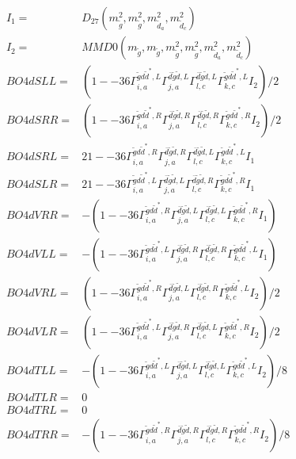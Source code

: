\documentclass[A4,landscape]{article}
\begin{document}
\begin{align} 
I_1 = & D_{27}(m^2_{\tilde{g}}, m^2_{\tilde{g}}, m^2_{\tilde{d}_{{a}}}, m^2_{\tilde{d}_{{c}}}) \\ 
I_2 = & MMD0(m_{\tilde{g}}, m_{\tilde{g}}, m^2_{\tilde{g}}, m^2_{\tilde{g}}, m^2_{\tilde{d}_{{a}}}, m^2_{\tilde{d}_{{c}}}) \\ 
  BO4dSLL= & (1
--
36 \Gamma^{\tilde{g} d \tilde{d}^*,L}_{i, a} \Gamma^{\bar{d}\tilde{g} \tilde{d} ,L}_{j, a} \Gamma^{\bar{d}\tilde{g} \tilde{d} ,L}_{l, c} \Gamma^{\tilde{g} d \tilde{d}^*,L}_{k, c} I_2)/2 \\ 
  BO4dSRR= & (1
--
36 \Gamma^{\tilde{g} d \tilde{d}^*,R}_{i, a} \Gamma^{\bar{d}\tilde{g} \tilde{d} ,R}_{j, a} \Gamma^{\bar{d}\tilde{g} \tilde{d} ,R}_{l, c} \Gamma^{\tilde{g} d \tilde{d}^*,R}_{k, c} I_2)/2 \\ 
  BO4dSRL= & 2 1
--
36 \Gamma^{\tilde{g} d \tilde{d}^*,R}_{i, a} \Gamma^{\bar{d}\tilde{g} \tilde{d} ,R}_{j, a} \Gamma^{\bar{d}\tilde{g} \tilde{d} ,L}_{l, c} \Gamma^{\tilde{g} d \tilde{d}^*,L}_{k, c} I_1 \\ 
  BO4dSLR= & 2 1
--
36 \Gamma^{\tilde{g} d \tilde{d}^*,L}_{i, a} \Gamma^{\bar{d}\tilde{g} \tilde{d} ,L}_{j, a} \Gamma^{\bar{d}\tilde{g} \tilde{d} ,R}_{l, c} \Gamma^{\tilde{g} d \tilde{d}^*,R}_{k, c} I_1 \\ 
  BO4dVRR= & -(1
--
36 \Gamma^{\tilde{g} d \tilde{d}^*,R}_{i, a} \Gamma^{\bar{d}\tilde{g} \tilde{d} ,L}_{j, a} \Gamma^{\bar{d}\tilde{g} \tilde{d} ,L}_{l, c} \Gamma^{\tilde{g} d \tilde{d}^*,R}_{k, c} I_1) \\ 
  BO4dVLL= & -(1
--
36 \Gamma^{\tilde{g} d \tilde{d}^*,L}_{i, a} \Gamma^{\bar{d}\tilde{g} \tilde{d} ,R}_{j, a} \Gamma^{\bar{d}\tilde{g} \tilde{d} ,R}_{l, c} \Gamma^{\tilde{g} d \tilde{d}^*,L}_{k, c} I_1) \\ 
  BO4dVRL= & (1
--
36 \Gamma^{\tilde{g} d \tilde{d}^*,R}_{i, a} \Gamma^{\bar{d}\tilde{g} \tilde{d} ,L}_{j, a} \Gamma^{\bar{d}\tilde{g} \tilde{d} ,R}_{l, c} \Gamma^{\tilde{g} d \tilde{d}^*,L}_{k, c} I_2)/2 \\ 
  BO4dVLR= & (1
--
36 \Gamma^{\tilde{g} d \tilde{d}^*,L}_{i, a} \Gamma^{\bar{d}\tilde{g} \tilde{d} ,R}_{j, a} \Gamma^{\bar{d}\tilde{g} \tilde{d} ,L}_{l, c} \Gamma^{\tilde{g} d \tilde{d}^*,R}_{k, c} I_2)/2 \\ 
  BO4dTLL= & -(1
--
36 \Gamma^{\tilde{g} d \tilde{d}^*,L}_{i, a} \Gamma^{\bar{d}\tilde{g} \tilde{d} ,L}_{j, a} \Gamma^{\bar{d}\tilde{g} \tilde{d} ,L}_{l, c} \Gamma^{\tilde{g} d \tilde{d}^*,L}_{k, c} I_2)/8 \\ 
  BO4dTLR= & 0 \\ 
  BO4dTRL= & 0 \\ 
  BO4dTRR= & -(1
--
36 \Gamma^{\tilde{g} d \tilde{d}^*,R}_{i, a} \Gamma^{\bar{d}\tilde{g} \tilde{d} ,R}_{j, a} \Gamma^{\bar{d}\tilde{g} \tilde{d} ,R}_{l, c} \Gamma^{\tilde{g} d \tilde{d}^*,R}_{k, c} I_2)/8 \\ 
\end{align} 
\end{document}
